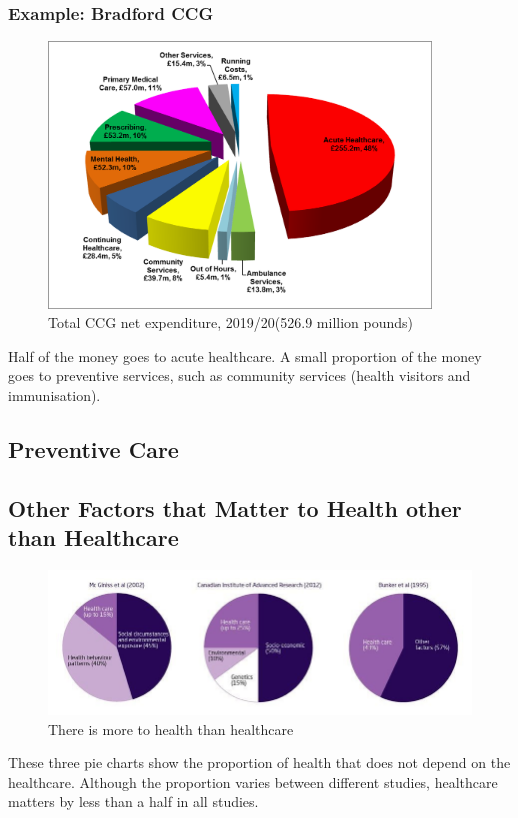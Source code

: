         \subsubsection{Example: Bradford CCG}         
            \begin{figure}[H]
                \centering
                \includegraphics[width=4in]{images/ch3/12.png}
                \caption{Total CCG net expenditure, 2019/20(526.9 million pounds)}
            \end{figure} 
            Half of the money goes to acute healthcare. A small proportion of the money goes to preventive services, such as community services (health visitors and immunisation).
        
        \subsection{Preventive Care}
        
             \subsection{Other Factors that Matter to Health other than Healthcare} 
                \begin{figure}[H]
                    \centering
                    \includegraphics[width=5in]{images/ch3/14.png}
                    \caption{There is more to health than healthcare}
                \end{figure} 
                These three pie charts show the proportion of health that does not depend on the healthcare. Although the proportion varies between different studies, healthcare matters by less than a half in all studies.
    
